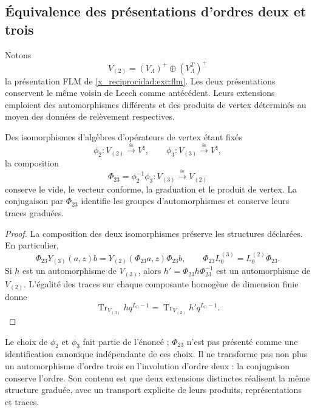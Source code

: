 \subsection{Équivalence des présentations d'ordres deux et trois}
\label{x_reciprocidad:km:equivalencia-dos-tres}

Notons
\[
 V_{(2)}=(V_\Lambda)^+\oplus(V_\Lambda^T)^+
\]
la présentation FLM de \eqref{x_reciprocidad:exc:flm}. Les deux présentations conservent le même voisin de Leech comme antécédent. Leurs extensions emploient des automorphismes différents et des produits de vertex déterminés au moyen des données de relèvement respectives.

\begin{theorem}
\label{x_reciprocidad:km:equivalencia-voa}
Des isomorphismes d'algèbres d'opérateurs de vertex étant fixés
\[
 \phi_2:V_{(2)}\xrightarrow{\ \cong\ }V^\natural,
 \qquad
 \phi_3:V_{(3)}\xrightarrow{\ \cong\ }V^\natural,
\]
la composition
\begin{equation}
 \Phi_{23}=\phi_2^{-1}\phi_3:
 V_{(3)}\xrightarrow{\ \cong\ }V_{(2)}
 \label{x_reciprocidad:km:Phi23}
\end{equation}
conserve le vide, le vecteur conforme, la graduation et le produit de vertex. La conjugaison par \(\Phi_{23}\) identifie les groupes d'automorphismes et conserve leurs traces graduées.
\end{theorem}
\begin{proof}
La composition des deux isomorphismes préserve les structures
déclarées. En particulier,
\[
 \Phi_{23}Y_{(3)}(a,z)b
 =Y_{(2)}(\Phi_{23}a,z)\Phi_{23}b,
 \qquad
 \Phi_{23}L_0^{(3)}=L_0^{(2)}\Phi_{23}.
\]
Si \(h\) est un automorphisme de \(V_{(3)}\), alors
\(h' =\Phi_{23}h\Phi_{23}^{-1}\) est un automorphisme de
\(V_{(2)}\). L'égalité des traces sur chaque composante homogène
de dimension finie donne
\[
 \operatorname{Tr}_{V_{(3)}}h q^{L_0-1}
 =\operatorname{Tr}_{V_{(2)}}h' q^{L_0-1}.
\]
\end{proof}

Le choix de \(\phi_2\) et \(\phi_3\) fait partie de l'énoncé ;
\(\Phi_{23}\) n'est pas présenté comme une identification canonique
indépendante de ces choix. Il ne transforme pas non plus un automorphisme
d'ordre trois en l'involution d'ordre deux : la conjugaison conserve
l'ordre. Son contenu est que deux extensions distinctes réalisent la
même structure graduée, avec un transport explicite de leurs produits,
représentations et traces.

